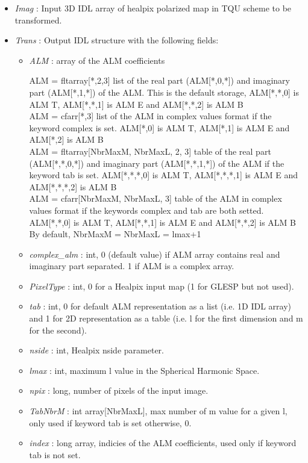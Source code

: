 \begin{itemize}
\item {\em Imag} : Input 3D IDL array of healpix polarized map in TQU scheme to be transformed.
\item {\em Trans} : Output IDL structure with the following fields:
\begin{itemize}
\item {\em ALM} : array of the ALM coefficients
\begin{center}
ALM = fltarray[*,2,3] list of the real part (ALM[*,0,*]) and imaginary part (ALM[*,1,*]) of the ALM. 
This is the default storage, ALM[*,*,0] is ALM T, ALM[*,*,1] is ALM E and ALM[*,*,2] is ALM B\\
ALM = cfarr[*,3] list of the ALM in complex values format if the keyword complex is set. 
ALM[*,0] is ALM T, ALM[*,1] is ALM E and ALM[*,2] is ALM B\\
ALM = fltarray[NbrMaxM, NbrMaxL, 2, 3] table of the real part (ALM[*,*,0,*]) and imaginary part (ALM[*,*,1,*]) 
of the ALM if the keyword tab is set. ALM[*,*,*,0] is ALM T, ALM[*,*,*,1] is ALM E and ALM[*,*,*,2] is ALM B\\
ALM = cfarr[NbrMaxM, NbrMaxL, 3] table of the ALM in complex values format if the keywords complex and tab 
are both setted. ALM[*,*,0] is ALM T, ALM[*,*,1] is ALM E and ALM[*,*,2] is ALM B\\
By default, NbrMaxM = NbrMaxL = lmax+1
\end{center}
\item {\em complex\_alm} : int, 0 (default value) if ALM array contains real and imaginary part separated. 
1 if ALM is a complex array.
\item {\em PixelType} : int, 0 for a Healpix input map (1 for GLESP but not used).
\item {\em tab} : int, 0 for default ALM representation as a list (i.e. 1D IDL array) and 1 for 2D 
representation as a table (i.e. l for the first dimension and m for the second).
\item {\em nside} : int, Healpix nside parameter.
\item {\em lmax} : int, maximum l value in the Spherical Harmonic Space.
\item {\em npix} : long, number of pixels of the input image.
\item {\em TabNbrM} : int array[NbrMaxL], max number of m value for a given l, only used if keyword tab is set otherwise, 0.
\item {\em index} : long array, indicies of the ALM coefficients, used only if keyword tab is not set.

\end{itemize}
\end{itemize}

